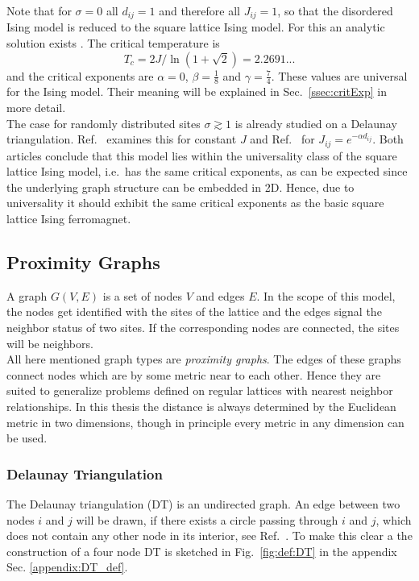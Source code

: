     Note that for \(\sigma = 0\) all \(d_{ij} = 1\) and therefore all
    \(J_{ij} = 1\), so that the disordered Ising model is reduced to the
    square lattice Ising model. For this an analytic solution exists \cite{Onsager1944}.
    The critical temperature is
    \begin{equation}
        T_c = 2J/\ln(1+\sqrt 2) = 2.2691...
        \label{eq:exactTc}
    \end{equation}
    and the critical exponents are \(\alpha = 0\), \(\beta = \frac{1}{8}\)
    and \(\gamma = \frac{7}{4}\). These values are universal for the Ising
    model. Their meaning will be explained in Sec.\ \ref{ssec:critExp} in more detail.\\
    The case for randomly distributed sites \(\sigma \gtrsim 1\) is
    already studied on a Delaunay triangulation. Ref.\ \cite{Janke1994} examines
    this for constant \(J\) and Ref.\ \cite{Lima2000} for \(J_{ij} = e^{-\alpha d_{ij}}\).
    Both articles conclude that this model lies within the universality
    class of the square lattice Ising model, i.e.\ has the same critical
    exponents, as can be expected since the underlying graph structure can
    be embedded in 2D. Hence, due to universality it should exhibit the same
    critical exponents as the basic square lattice Ising ferromagnet.

\subsection{Proximity Graphs}
\label{ssec:graphtypes}
    A graph \(G(V,E)\) is a set of nodes \(V\) and edges \(E\). In the
    scope of this model, the nodes get identified with the sites of the
    lattice and the edges signal the neighbor status of two sites. If the
    corresponding nodes are connected, the sites will be neighbors.\\
    All here mentioned graph types are \emph{proximity graphs}.
    The edges of these graphs connect nodes which are by some metric near
    to each other.
    Hence they are suited to generalize problems defined on regular
    lattices with nearest neighbor relationships.
    In this thesis the distance is always determined by the Euclidean
    metric in two dimensions, though in principle every metric in any
    dimension can be used.\\

    \subsubsection{Delaunay Triangulation}
        The Delaunay triangulation (DT) is an undirected graph. An edge
        between two nodes \(i\) and \(j\) will be drawn, if there exists
        a circle passing through \(i\) and \(j\), which does not contain
        any other node in its interior, see Ref.\ \cite{Katajainen}.
        To make this clear a the construction of a four node DT is sketched
        in Fig.\ \ref{fig:def:DT} in the appendix Sec. \ref{appendix:DT_def}.

